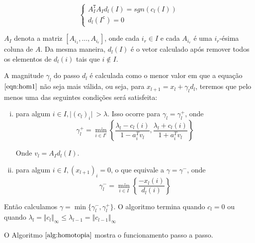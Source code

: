 \begin{equation}
\begin{cases}
A^{\texttt{T}}_I A_I d_l(I) = sgn (c_l(I)) \\
d_l(I^{\texttt{c}}) = 0
\end{cases}
\label{eqn:hom2}
\end{equation}

$A_I$ denota a matriz $\left[A_{i_1}, \hdots, A_{i_r}\right]$, onde cada $i_r \in I$ e cada $A_{i_r}$ é uma $i_r$-ésima coluna de $A$. Da mesma maneira, $d_l(I)$ é o vetor calculado após remover todos os elementos de $d_l(i)$ tais que $i \notin I$.

A magnitude $\gamma_l$ do passo $d_l$ é calculada como o menor valor em que a equação $\eqref{eqn:hom1}$ não seja mais válida, ou seja, para $x_{l+1} = x_{l} + \gamma_l d_l$, teremos que pelo menos uma das seguintes condições será satisfeita:

\begin{enumerate}[(i)]
\item para algum $i \in I, \vert (c_l)_i \vert \ > \lambda$. Isso ocorre para $\gamma_l = \gamma_l^{+}$, onde
$$ \gamma_l^{+} = \min_{i \in I^c} \left\lbrace \frac{\lambda_l - c_l(i)}{1 - a_i^T v_l}, \frac{\lambda_l + c_l(i)}{1 + a_i^T v_l} \right\rbrace$$

Onde $v_l = A_I d_l(I)$.

\item para algum $i \in I, (x_{l+1})_i = 0$, o que equivale a $\gamma = \gamma^{-}$, onde
$$ \gamma_l^{-} = \min_{i \in I} \left\lbrace \frac{- x_l(i)}{d_l(i)} \right\rbrace$$
\end{enumerate}

Então calculamos $\gamma = \min \lbrace \gamma_l^{-}, \gamma_l^{+} \rbrace$. O algoritmo termina quando $c_l = 0$ ou quando $ \lambda_{l} = \Vert c_{l} \Vert_{\infty} \leq \lambda_{l - 1} = \Vert c_{l - 1} \Vert_{\infty}$

O Algoritmo $\ref{alg:homotopia}$ mostra o funcionamento passo a passo.

